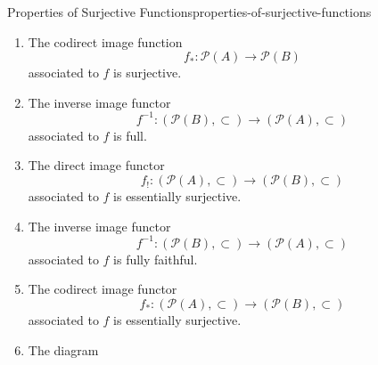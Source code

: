 \begin{proposition}{Properties of Surjective Functions}{properties-of-surjective-functions}
\begin{enumerate}
\begin{enumerate}
                    \[
                        f_{!}%
                        \colon%
                        \mathcal{P}(A)%
                        \to%
                        \mathcal{P}(B)%
                    \]%
                    associated to $f$ is surjective.
                \item\label{properties-of-surjective-functions-characterisations-6}The codirect image function
                    \[
                        f_{*}%
                        \colon%
                        \mathcal{P}(A)%
                        \to%
                        \mathcal{P}(B)%
                    \]%
                    associated to $f$ is surjective.
                \item\label{properties-of-surjective-functions-characterisations-7}The inverse image functor
                    \[
                        f^{-1}%
                        \colon%
                        (\mathcal{P}(B),\subset)%
                        \to%
                        (\mathcal{P}(A),\subset)%
                    \]%
                    associated to $f$ is full.
                \item\label{properties-of-surjective-functions-characterisations-8}The direct image functor
                    \[
                        f_{!}%
                        \colon%
                        (\mathcal{P}(A),\subset)%
                        \to%
                        (\mathcal{P}(B),\subset)%
                    \]%
                    associated to $f$ is essentially surjective.
                \item\label{properties-of-surjective-functions-characterisations-9}The inverse image functor
                    \[
                        f^{-1}%
                        \colon%
                        (\mathcal{P}(B),\subset)%
                        \to%
                        (\mathcal{P}(A),\subset)%
                    \]%
                    associated to $f$ is fully faithful.
                \item\label{properties-of-surjective-functions-characterisations-10}The codirect image functor
                    \[
                        f_{*}%
                        \colon%
                        (\mathcal{P}(A),\subset)%
                        \to%
                        (\mathcal{P}(B),\subset)%
                    \]%
                    associated to $f$ is essentially surjective.
                \item\label{properties-of-surjective-functions-characterisations-11}The diagram

\end{enumerate}
\end{enumerate}
\end{proposition}
